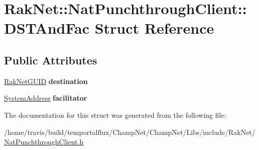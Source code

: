 \hypertarget{struct_rak_net_1_1_nat_punchthrough_client_1_1_d_s_t_and_fac}{\section{Rak\-Net\-:\-:Nat\-Punchthrough\-Client\-:\-:D\-S\-T\-And\-Fac Struct Reference}
\label{struct_rak_net_1_1_nat_punchthrough_client_1_1_d_s_t_and_fac}
}
\subsection*{Public Attributes}
\begin{DoxyCompactItemize}
\item 
\hypertarget{struct_rak_net_1_1_nat_punchthrough_client_1_1_d_s_t_and_fac_af6b88cda1b8812b16ea8c5c84d751507}{\hyperlink{struct_rak_net_1_1_rak_net_g_u_i_d}{Rak\-Net\-G\-U\-I\-D} {\bfseries destination}}\label{struct_rak_net_1_1_nat_punchthrough_client_1_1_d_s_t_and_fac_af6b88cda1b8812b16ea8c5c84d751507}

\item 
\hypertarget{struct_rak_net_1_1_nat_punchthrough_client_1_1_d_s_t_and_fac_aa01716df07c082bc01355561035ae781}{\hyperlink{struct_rak_net_1_1_system_address}{System\-Address} {\bfseries facilitator}}\label{struct_rak_net_1_1_nat_punchthrough_client_1_1_d_s_t_and_fac_aa01716df07c082bc01355561035ae781}

\end{DoxyCompactItemize}


The documentation for this struct was generated from the following file\-:\begin{DoxyCompactItemize}
\item 
/home/travis/build/temportalflux/\-Champ\-Net/\-Champ\-Net/\-Libs/include/\-Rak\-Net/\hyperlink{_nat_punchthrough_client_8h}{Nat\-Punchthrough\-Client.\-h}\end{DoxyCompactItemize}
